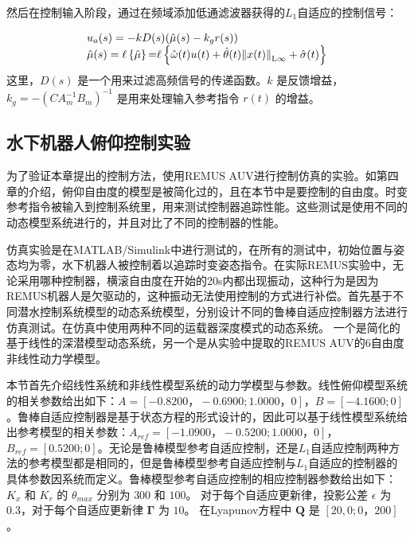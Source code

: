 然后在控制输入阶段，通过在频域添加低通滤波器获得的$L_1$自适应的控制信号：

\begin{equation}
\begin{array}{l}
 {u_a}(s) =  - kD(s)(\hat \mu (s) - {k_g}r(s)) \\
 \hat \mu (s) = \ell \left\{ {\hat \mu } \right\}{\rm{ = }}\ell \left\{ {\hat \omega (t)u(t) + \hat \theta (t){{\left\| {x(t)} \right\|}_{{\rm{L}}\infty }} + \hat \sigma (t)} \right\} \\
 \end{array}
 \label{eq:chap5:59}
\end{equation}
这里，$D(s)$ 是一个用来过滤高频信号的传递函数。$k$ 是反馈增益，$k_g=-(CA_{m}^{-1}B_m)^{-1}$ 是用来处理输入参考指令 $r(t)$ 的增益。


\subsection{水下机器人俯仰控制实验 }

为了验证本章提出的控制方法，使用REMUS AUV进行控制仿真的实验。如第四章的介绍，俯仰自由度的模型是被简化过的，且在本节中是要控制的自由度。时变参考指令被输入到控制系统里，用来测试控制器追踪性能。这些测试是使用不同的动态模型系统进行的，并且对比了不同的控制器的性能。

仿真实验是在MATLAB/Simulink中进行测试的，在所有的测试中，初始位置与姿态均为零，水下机器人被控制着以追踪时变姿态指令。在实际REMUS实验中，无论采用哪种控制器，横滚自由度在开始的20s内都出现振动，这种行为是因为REMUS机器人是欠驱动的，这种振动无法使用控制的方式进行补偿。首先基于不同潜水控制系统模型的动态系统模型，分别设计不同的鲁棒自适应控制器方法进行仿真测试。在仿真中使用两种不同的运载器深度模式的动态系统。 一个是简化的基于线性的深潜模型动态系统，另一个是从实验中提取的REMUS AUV的6自由度非线性动力学模型\cite{prestero2001development,prestero2001verification}。

本节首先介绍线性系统和非线性模型系统的动力学模型与参数。线性俯仰模型系统的相关参数给出如下：$ A= [-0.8200，-0.6900; 1.0000，0]$，$B = [ - 4.1600; 0]$ 。鲁棒自适应控制器是基于状态方程的形式设计的，因此可以基于线性模型系统给出参考模型的相关参数：$ A_ {ref} = [ - 1.0900，-0.5200; 1.0000，0]$，$ B_ {ref} = [0.5200;0]$。无论是鲁棒模型参考自适应控制，还是$L_1$自适应控制两种方法的参考模型都是相同的，但是鲁棒模型参考自适应控制与$L_1$自适应的控制器的具体参数因系统而定义。鲁棒模型参考自适应控制的相应控制器参数给出如下：$K_x$ 和 $K_r$ 的 $\theta_ {max}$ 分别为 $300$ 和 $100$。 对于每个自适应更新律，投影公差 $\epsilon$ 为 $0.3$，对于每个自适应更新律 $\bm{\Gamma}$ 为 $10$。 在Lyapunov方程中 $\bm {Q} $ 是 $[20,0; 0，200]$。


